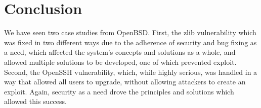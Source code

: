 \documentclass[12pt]{article}
\begin{document}
{\section*{Conclusion}

We have seen two case studies from OpenBSD. First, the zlib vulnerability which was fixed in two different ways due to the adherence of security and bug fixing as a need, which affected the system's concepts and solutions as a whole, and allowed multiple solutions to be developed, one of which prevented exploit. Second, the OpenSSH vulnerability, which, while highly serious, was handled in a way that allowed all users to upgrade, without allowing attackers to create an exploit. Again, security as a need drove the principles and solutions which allowed this success.

}
\end{document}
